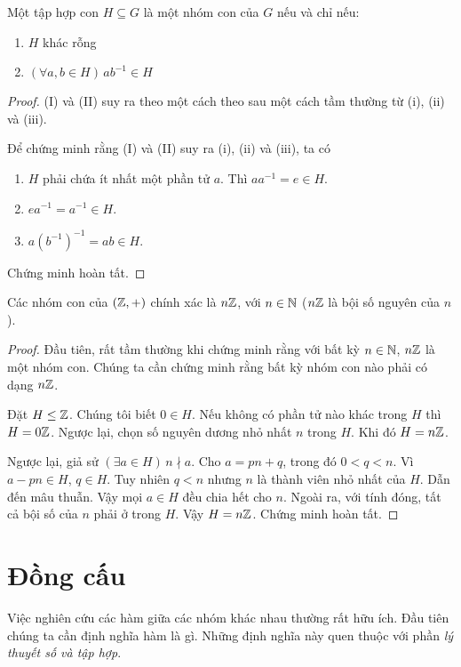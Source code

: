 \begin{lemma}
  Một tập hợp con $H\subseteq G$ là một nhóm con của $G$ nếu và chỉ nếu:
  \begin{enumerate}[label=(\Roman{*})]
    \item $H$ khác rỗng
    \item $(\forall a, b\in H)\,ab^{-1}\in H$
  \end{enumerate}
\end{lemma}
\begin{proof}
  (I) và (II) suy ra theo một cách theo sau một cách tầm thường từ (i), (ii) và (iii).

  Để chứng minh rằng (I) và (II) suy ra (i), (ii) và (iii), ta có
  \begin{enumerate}
    \item $H$ phải chứa ít nhất một phần tử $a$. Thì $aa^{-1} = e \in H$.
      \setcounter{enumi}{2}
    \item $ea^{-1} = a^{-1} \in H$.
      \setcounter{enumi}{1}
    \item $a(b^{-1})^{-1} = ab\in H$.
  \end{enumerate}
  Chứng minh hoàn tất.
\end{proof}
\begin{prop}
  Các nhóm con của $(\mathbb{Z}, +)$ chính xác là $n\mathbb{Z}$, với $n\in \mathbb{N}$ ($n\mathbb{Z}$ là bội số nguyên của $n$).
\end{prop}
\begin{proof}
  Đầu tiên, rất tầm thường khi chứng minh rằng với bất kỳ $n \in \mathbb{N}$, $n\mathbb{Z}$ là một nhóm con. Chúng ta cần chứng minh rằng bất kỳ nhóm con nào phải có dạng $n\mathbb{Z}$.

  Đặt $H\leq \mathbb{Z}$. Chúng tôi biết $0\in H$. Nếu không có phần tử nào khác trong $H$ thì $H = 0\mathbb{Z}$. Ngược lại, chọn số nguyên dương nhỏ nhất $n$ trong $H$. Khi đó $H=n\mathbb{Z}$.

  Ngược lại, giả sử $(\exists a\in H)\,n \nmid a$. Cho $a = pn + q$, trong đó $0 < q < n$. Vì $a - pn\in H$, $q\in H$. Tuy nhiên $q < n$ nhưng $n$ là thành viên nhỏ nhất của $H$. Dẫn đến mâu thuẫn. Vậy mọi $a\in H$ đều chia hết cho $n$. Ngoài ra, với tính đóng, tất cả bội số của $n$ phải ở trong $H$. Vậy $H = n\mathbb{Z}$.
  Chứng minh hoàn tất.
\end{proof}

\section{Đồng cấu}

Việc nghiên cứu các hàm giữa các nhóm khác nhau thường rất hữu ích. Đầu tiên chúng ta cần định nghĩa hàm là gì. Những định nghĩa này quen thuộc với phần \emph{lý thuyết số và tập hợp}.

